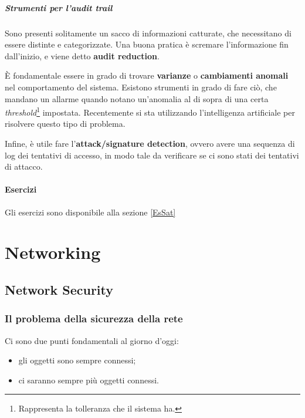 \subsubsection{Strumenti per l'audit trail}

Sono presenti solitamente un sacco di informazioni catturate, che necessitano
di essere distinte e categorizzate.
Una buona pratica è scremare l'informazione fin dall'inizio, e viene detto
\textbf{audit reduction}.

È fondamentale essere in grado di trovare \textbf{varianze} o \textbf{
cambiamenti anomali} nel comportamento del sistema. Esistono strumenti in 
grado di fare ciò, che mandano un allarme quando notano un'anomalia al di 
sopra di una certa \textit{threshold}\footnote{Rappresenta la tolleranza che 
il sistema ha.} impostata. Recentemente si sta utilizzando l'intelligenza 
artificiale per risolvere questo tipo di problema.

Infine, è utile fare l'\textbf{attack/signature detection}, ovvero 
avere una sequenza di log dei tentativi di accesso, in modo tale da 
verificare se ci sono stati dei tentativi di attacco.

\subsection{Esercizi}

Gli esercizi sono disponibile alla sezione \ref{EsSat}


\part{Networking}

\label{net}

\chapter{Network Security}

\section{Il problema della sicurezza della rete}

Ci sono due punti fondamentali al giorno d'oggi:

\begin{itemize}
\item gli oggetti sono sempre connessi;
\item ci saranno sempre più oggetti connessi.
\end{itemize}

